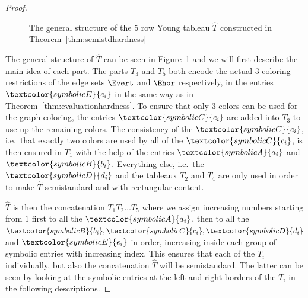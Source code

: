 \begin{proof}
    \begin{figure}[tpb]
        \centering
        \caption{The general structure of the $5$ row Young tableau $\hat{T}$ constructed in Theorem~\ref{thm:semistdhardness}}
        \label{fig:semistdhardnesstructure}
    \end{figure}

    The general structure of $\hat{T}$ can be seen in Figure~\ref{fig:semistdhardnesstructure} and we will first describe the main idea of each part.
    The parts $T_3$ and $T_5$ both encode the actual $3$-coloring restrictions of the edge sets $\Evert$ and $\Ehor$ respectively, in the entries $\textcolor{symbolicE}{e_i}$ in the same way as in Theorem~\ref{thm:evaluationhardness}.
    To ensure that only $3$ colors can be used for the graph coloring, the entries $\textcolor{symbolicC}{c_i}$ are added into $T_3$ to use up the remaining colors.
    The consistency of the $\textcolor{symbolicC}{c_i}$, i.e.\ that exactly two colors are used by all of the $\textcolor{symbolicC}{c_i}$, is then ensured in $T_1$ with the help of the entries $\textcolor{symbolicA}{a_i}$ and $\textcolor{symbolicB}{b_i}$.
    Everything else, i.e.\ the $\textcolor{symbolicD}{d_i}$ and the tableaux $T_2$ and $T_4$ are only used in order to make $\hat{T}$ semistandard and with rectangular content.

    $\hat{T}$ is then the concatenation $T_1 T_2 \dots T_5$ where we assign increasing numbers starting from $1$ first to all the $\textcolor{symbolicA}{a_i}$, then to all the $\textcolor{symbolicB}{b_i}, \textcolor{symbolicC}{c_i}, \textcolor{symbolicD}{d_i}$ and $\textcolor{symbolicE}{e_i}$ in order, increasing inside each group of symbolic entries with increasing index.
    This ensures that each of the $T_i$ individually, but also the concatenation $\hat{T}$ will be semistandard.
    The latter can be seen by looking at the symbolic entries at the left and right borders of the $T_i$ in the following descriptions.


\end{proof}
